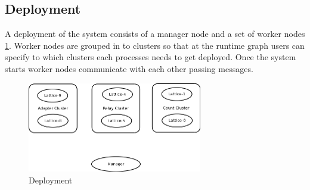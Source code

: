 

\subsection{Deployment}

A deployment of the system consists of a manager node and a set of worker nodes \ref{deployment}. Worker nodes are grouped in to clusters so that at the runtime graph users can specify to which clusters each processes needs to get deployed. Once the system starts worker nodes communicate with each other passing messages.

\begin{figure}[!t]
        \centering
        \includegraphics[width=3.0in]{deployment.png}
        \caption{Deployment}
        \label{deployment}
\end{figure}



 
